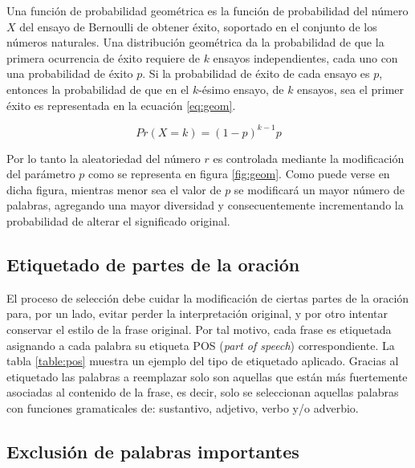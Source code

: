 Una función de probabilidad geométrica es la función de probabilidad del número $X$ del ensayo de Bernoulli de obtener éxito, soportado en el conjunto de los números naturales. Una distribución geométrica da la probabilidad de que la primera ocurrencia de éxito requiere de $k$ ensayos independientes, cada uno con una probabilidad de éxito $p$. Si la probabilidad de éxito de cada ensayo es $p$, entonces la probabilidad de que en el $k$-ésimo ensayo, de $k$ ensayos, sea el primer éxito es representada en la ecuación \ref{eq:geom}.

\begin{equation} \label{eq:geom}
    Pr(X=k)=(1-p)^{k-1}p
\end{equation}

Por lo tanto la aleatoriedad del número $r$ es controlada mediante la modificación del parámetro $p$ como se representa en figura \ref{fig:geom}. Como puede verse en dicha figura, mientras menor sea el valor de $p$ se modificará un mayor número de palabras, agregando una mayor diversidad  y consecuentemente incrementando la probabilidad de alterar el significado original. 


\subsection{Etiquetado de partes de la oración}

El proceso de selección debe cuidar la modificación de ciertas partes de la oración para, por un lado, evitar perder la interpretación original, y por otro intentar conservar el estilo de la frase original. Por tal motivo, cada frase es etiquetada asignando a cada palabra su etiqueta POS (\textit{part of speech}) correspondiente. La tabla \ref{table:pos} muestra un ejemplo del tipo de etiquetado aplicado. Gracias al etiquetado las palabras a reemplazar solo son aquellas que están más fuertemente asociadas al contenido de la frase, es decir, solo se seleccionan aquellas palabras con funciones gramaticales de: sustantivo, adjetivo, verbo y/o adverbio.



\subsection{Exclusión de palabras importantes}


